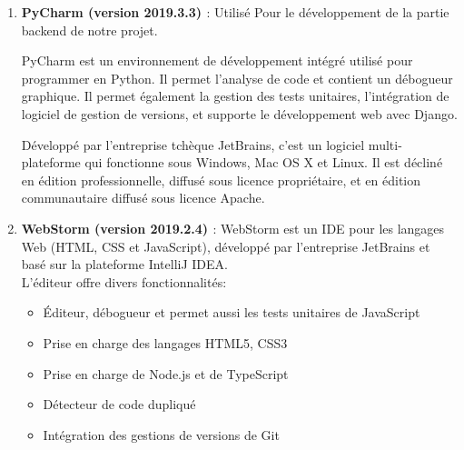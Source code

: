 \begin{enumerate}

\item \textbf{PyCharm (version 2019.3.3) \cite{pycharm}}: 
Utilisé Pour le développement de la partie backend de notre projet.

PyCharm est un environnement de développement intégré utilisé pour programmer en Python. Il permet l'analyse de code et contient un débogueur graphique. Il permet également la gestion des tests unitaires, l'intégration de logiciel de gestion de versions, et supporte le développement web avec Django.

Développé par l'entreprise tchèque JetBrains, c'est un logiciel multi-plateforme qui fonctionne sous Windows, Mac OS X et Linux. Il est décliné en édition professionnelle, diffusé sous licence propriétaire, et en édition communautaire diffusé sous licence Apache.

\item \textbf{WebStorm (version 2019.2.4) \cite{webstorm}}: 
WebStorm est un IDE pour les langages Web (HTML, CSS et JavaScript), développé par l'entreprise JetBrains et basé sur la plateforme IntelliJ IDEA.\\
L'éditeur offre divers fonctionnalités:
\begin{itemize}
    \item Éditeur, débogueur et permet aussi les tests unitaires de JavaScript
    \item Prise en charge des langages HTML5, CSS3
    \item Prise en charge de Node.js et de TypeScript
    \item Détecteur de code dupliqué
    \item Intégration des gestions de versions de Git
\end{itemize}
\end{enumerate}

\begin{comment}
\subsubsection{Serveur : IIS (Internet Information Services)}
C’est le serveur flexible de Microsoft qui s’exécute sous Windows. Pour notre application on a utilisé le serveur IIS
qui est un service Windows permet d'héberger et de gérer des sites Web sur des systèmes Windows.
\end{comment}

